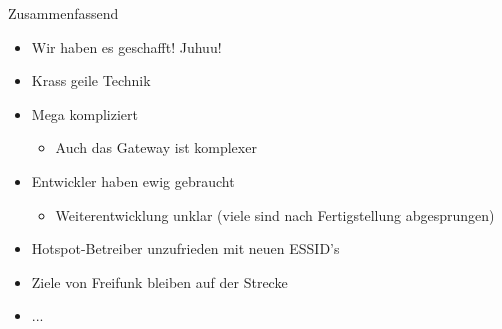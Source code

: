 \begin{frame}{Zusammenfassend}
    \begin{itemize}
        \item Wir haben es geschafft! Juhuu!
        \item Krass geile Technik
        \item Mega kompliziert
        \begin{itemize}
            \item Auch das Gateway ist komplexer
        \end{itemize}
        \item Entwickler haben ewig gebraucht
        \begin{itemize}
            \item Weiterentwicklung unklar (viele sind nach Fertigstellung abgesprungen)
        \end{itemize}
        \item Hotspot-Betreiber unzufrieden mit neuen ESSID's
        \item Ziele von Freifunk bleiben auf der Strecke
        \item ...
    \end{itemize}
\end{frame}
